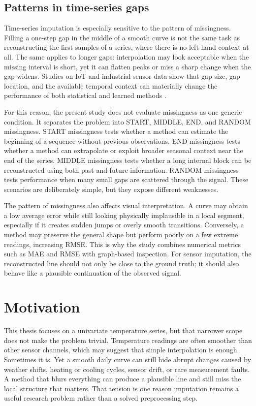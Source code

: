 \subsection{Patterns in time-series gaps}
Time-series imputation is especially sensitive to the pattern of missingness. Filling a one-step gap in the middle of a smooth curve is not the same task as reconstructing the first samples of a series, where there is no left-hand context at all. The same applies to longer gaps: interpolation may look acceptable when the missing interval is short, yet it can flatten peaks or miss a sharp change when the gap widens. Studies on IoT and industrial sensor data show that gap size, gap location, and the available temporal context can materially change the performance of both statistical and learned methods \cite{Wu2022DataIF,Ahmed2022LongGM,Toye2025BenchmarkingMD}.

For this reason, the present study does not evaluate missingness as one generic condition. It separates the problem into START, MIDDLE, END, and RANDOM missingness. START missingness tests whether a method can estimate the beginning of a sequence without previous observations. END missingness tests whether a method can extrapolate or exploit broader seasonal context near the end of the series. MIDDLE missingness tests whether a long internal block can be reconstructed using both past and future information. RANDOM missingness tests performance when many small gaps are scattered through the signal. These scenarios are deliberately simple, but they expose different weaknesses.

The pattern of missingness also affects visual interpretation. A curve may obtain a low average error while still looking physically implausible in a local segment, especially if it creates sudden jumps or overly smooth transitions. Conversely, a method may preserve the general shape but perform poorly on a few extreme readings, increasing RMSE. This is why the study combines numerical metrics such as MAE and RMSE with graph-based inspection. For sensor imputation, the reconstructed line should not only be close to the ground truth; it should also behave like a plausible continuation of the observed signal.

\section{Motivation}
This thesis focuses on a univariate temperature series, but that narrower scope does not make the problem trivial. Temperature readings are often smoother than other sensor channels, which may suggest that simple interpolation is enough. Sometimes it is. Yet a smooth daily curve can still hide abrupt changes caused by weather shifts, heating or cooling cycles, sensor drift, or rare measurement faults. A method that blurs everything can produce a plausible line and still miss the local structure that matters. That tension is one reason imputation remains a useful research problem rather than a solved preprocessing step.

